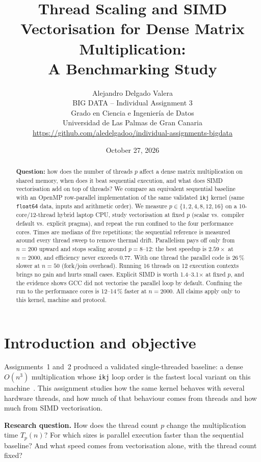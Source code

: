 \documentclass[11pt,a4paper]{article}
\title{\textbf{Thread Scaling and SIMD Vectorisation for Dense Matrix
Multiplication:\\ A Benchmarking Study}}
\author{Alejandro Delgado Valera\\
\small BIG DATA -- Individual Assignment 3\\
\small Grado en Ciencia e Ingenier{\'i}a de Datos\\
\small Universidad de Las Palmas de Gran Canaria\\
\small \url{https://github.com/aledelgadoo/individual-assignments-bigdata}}
\date{October 27, 2026}
\begin{document}
\maketitle

\begin{abstract}
\noindent\textbf{Question:} how does the number of threads $p$ affect a dense
matrix multiplication on shared memory, when does it beat sequential
execution, and what does SIMD vectorisation add on top of threads? We compare
an equivalent sequential baseline with an OpenMP row-parallel implementation
of the same validated \texttt{ikj} kernel (same \texttt{float64} data,
inputs and arithmetic order). We measure $p \in \{1,2,4,8,12,16\}$ on a
10-core/12-thread hybrid laptop CPU, study vectorisation at fixed $p$
(scalar vs.\ compiler default vs.\ explicit pragma), and repeat the run
confined to the four performance cores. Times are medians of five
repetitions; the sequential reference is measured around every thread sweep
to remove thermal drift. Parallelism pays off only from $n=200$ upward and
stops scaling around $p=8$--$12$: the best speedup is $2.59\times$ at
$n=2000$, and efficiency never exceeds $0.77$. With one thread the parallel
code is 26\,\% slower at $n=50$ (fork/join overhead). Running 16 threads on
12 execution contexts brings no gain and hurts small cases. Explicit SIMD is
worth 1.4--3.1$\times$ at fixed $p$, and the evidence shows GCC did not
vectorise the parallel loop by default. Confining the run to the performance
cores is 12--14\,\% faster at $n=2000$. All claims apply only to this
kernel, machine and protocol.
\end{abstract}

\section{Introduction and objective}

Assignments~1 and~2 produced a validated single-threaded baseline: a dense
$O(n^3)$ multiplication whose \texttt{ikj} loop order is the fastest local
variant on this machine~\cite{strang2016,cormen2022}. This assignment
studies how the same kernel behaves with several hardware threads, and how
much of that behaviour comes from threads and how much from SIMD
vectorisation.

\textbf{Research question.}
How does the thread count $p$ change the multiplication time $T_p(n)$? For
which sizes is parallel execution faster than the sequential baseline? And
what speed comes from vectorisation alone, with the thread count fixed?
\end{document}
